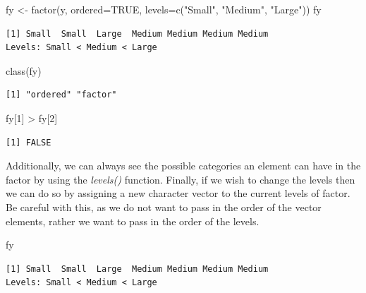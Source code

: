 \documentclass[
  letterpaper,
  DIV=11,
  numbers=noendperiod]{scrreprt}
\newenvironment{Shaded}{\begin{snugshade}}{\end{snugshade}}
\newcommand{\AttributeTok}[1]{\textcolor[rgb]{0.40,0.45,0.13}{#1}}
\newcommand{\ConstantTok}[1]{\textcolor[rgb]{0.56,0.35,0.01}{#1}}
\newcommand{\DecValTok}[1]{\textcolor[rgb]{0.68,0.00,0.00}{#1}}
\newcommand{\FunctionTok}[1]{\textcolor[rgb]{0.28,0.35,0.67}{#1}}
\newcommand{\NormalTok}[1]{\textcolor[rgb]{0.00,0.23,0.31}{#1}}
\newcommand{\OtherTok}[1]{\textcolor[rgb]{0.00,0.23,0.31}{#1}}
\newcommand{\SpecialCharTok}[1]{\textcolor[rgb]{0.37,0.37,0.37}{#1}}
\newcommand{\StringTok}[1]{\textcolor[rgb]{0.13,0.47,0.30}{#1}}
\begin{document}
\begin{Shaded}
\begin{Highlighting}[]
\NormalTok{fy }\OtherTok{\textless{}{-}} \FunctionTok{factor}\NormalTok{(y, }\AttributeTok{ordered=}\ConstantTok{TRUE}\NormalTok{, }\AttributeTok{levels=}\FunctionTok{c}\NormalTok{(}\StringTok{"Small"}\NormalTok{, }\StringTok{"Medium"}\NormalTok{, }\StringTok{"Large"}\NormalTok{))}
\NormalTok{fy}
\end{Highlighting}
\end{Shaded}

\begin{verbatim}
[1] Small  Small  Large  Medium Medium Medium Medium
Levels: Small < Medium < Large
\end{verbatim}

\begin{Shaded}
\begin{Highlighting}[]
\FunctionTok{class}\NormalTok{(fy)}
\end{Highlighting}
\end{Shaded}

\begin{verbatim}
[1] "ordered" "factor" 
\end{verbatim}

\begin{Shaded}
\begin{Highlighting}[]
\NormalTok{fy[}\DecValTok{1}\NormalTok{] }\SpecialCharTok{\textgreater{}}\NormalTok{ fy[}\DecValTok{2}\NormalTok{]}
\end{Highlighting}
\end{Shaded}

\begin{verbatim}
[1] FALSE
\end{verbatim}

Additionally, we can always see the possible categories an element can
have in the factor by using the \emph{levels()} function. Finally, if we
wish to change the levels then we can do so by assigning a new character
vector to the current levels of factor. Be careful with this, as we do
not want to pass in the order of the vector elements, rather we want to
pass in the order of the levels.

\begin{Shaded}
\begin{Highlighting}[]
\NormalTok{fy}
\end{Highlighting}
\end{Shaded}

\begin{verbatim}
[1] Small  Small  Large  Medium Medium Medium Medium
Levels: Small < Medium < Large
\end{verbatim}
\end{document}
